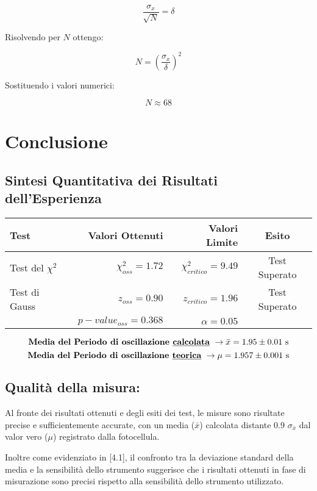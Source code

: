 \documentclass{article}
\begin{document}
\[\frac{\sigma_x}{\sqrt{N}} = \delta\]

\noindent Risolvendo per $N$ ottengo:

\[N = \left( \frac{\sigma_x}{\delta} \right)^2\]

\noindent Sostituendo i valori numerici:

\[N \approx 68 \]

\section{Conclusione}
\subsection{Sintesi Quantitativa dei Risultati dell'Esperienza}

\begin{table}[ht]
	\centering
	\begin{tabular}{|l|r|r|c|}
		\hline
		\textbf{Test} & \textbf{Valori Ottenuti} & \textbf{Valori Limite} & \textbf{Esito}  \\
		\hline
		Test del $\chi^2$ & $\chi^2_{oss} = 1.72$  & $\chi^2_{critico} = 9.49$ &  Test Superato \\
		\hline
		Test di Gauss & $z_{oss} = 0.90$ & $z_{critico} = 1.96$ & Test Superato \\
		& $p-value_{oss} = 0.368$ & $ \alpha = 0.05$ &   \\
		\hline
	\end{tabular}
	\label{tab:sintesi_quantitativa}
\end{table}

\[ \text{\textbf{Media del Periodo di oscillazione \underline{calcolata}}  } \rightarrow \bar{x} = 1.95 \pm 0.01\text{ s} \]
\[ \text{\textbf{Media del Periodo di oscillazione \underline{teorica}}    } \rightarrow \mu = 1.957 \pm 0.001 \text{ s} \]

\subsection{Qualità della misura:}
Al fronte dei risultati ottenuti e degli esiti dei test, le misure sono risultate precise e sufficientemente accurate, con un media ($\bar{x}$) calcolata distante 0.9 $\sigma_{\bar{x}}$ dal valor vero ($\mu$) registrato dalla fotocellula. 

Inoltre come evidenziato in [4.1], il confronto tra la deviazione standard della media e la sensibilità dello strumento suggerisce che i risultati ottenuti in fase di misurazione sono precisi rispetto alla sensibilità dello strumento utilizzato.
\end{document}
